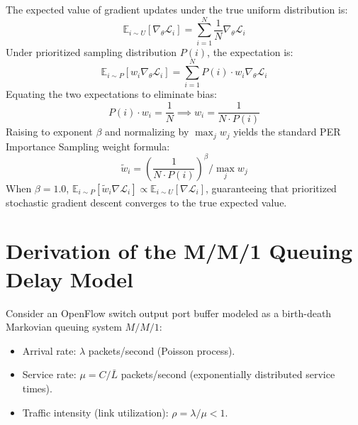 \documentclass[12pt,a4paper,oneside]{report}
\begin{document}
The expected value of gradient updates under the true uniform distribution is:
\begin{equation}
    \mathbb{E}_{i \sim U}[\nabla_\theta \mathcal{L}_i] = \sum_{i=1}^N \frac{1}{N} \nabla_\theta \mathcal{L}_i
\end{equation}
Under prioritized sampling distribution $P(i)$, the expectation is:
\begin{equation}
    \mathbb{E}_{i \sim P}\left[ w_i \nabla_\theta \mathcal{L}_i \right] = \sum_{i=1}^N P(i) \cdot w_i \nabla_\theta \mathcal{L}_i
\end{equation}
Equating the two expectations to eliminate bias:
\begin{equation}
    P(i) \cdot w_i = \frac{1}{N} \implies w_i = \frac{1}{N \cdot P(i)}
\end{equation}
Raising to exponent $\beta$ and normalizing by $\max_j w_j$ yields the standard PER Importance Sampling weight formula:
\begin{equation}
    \tilde{w}_i = \left( \frac{1}{N \cdot P(i)} \right)^\beta \Big/ \max_j w_j
\end{equation}
When $\beta = 1.0$, $\mathbb{E}_{i \sim P}[\tilde{w}_i \nabla \mathcal{L}_i] \propto \mathbb{E}_{i \sim U}[\nabla \mathcal{L}_i]$, guaranteeing that prioritized stochastic gradient descent converges to the true expected value.

\section{Derivation of the M/M/1 Queuing Delay Model}
Consider an OpenFlow switch output port buffer modeled as a birth-death Markovian queuing system $M/M/1$:
\begin{itemize}
    \item Arrival rate: $\lambda$ packets/second (Poisson process).
    \item Service rate: $\mu = C / \bar{L}$ packets/second (exponentially distributed service times).
    \item Traffic intensity (link utilization): $\rho = \lambda / \mu < 1$.
\end{itemize}
\end{document}
